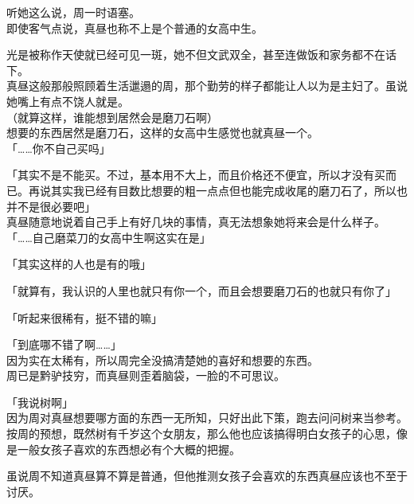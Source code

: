 听她这么说，周一时语塞。\\

即使客气点说，真昼也称不上是个普通的女高中生。

光是被称作天使就已经可见一斑，她不但文武双全，甚至连做饭和家务都不在话下。\\

真昼这般那般照顾着生活邋遢的周，那个勤劳的样子都能让人以为是主妇了。虽说她嘴上有点不饶人就是。\\

（就算这样，谁能想到居然会是磨刀石啊）\\

想要的东西居然是磨刀石，这样的女高中生感觉也就真昼一个。\\

「……你不自己买吗」

「其实不是不能买。不过，基本用不大上，而且价格还不便宜，所以才没有买而已。再说其实我已经有目数比想要的粗一点点但也能完成收尾的磨刀石了，所以也并不是很必要吧」\\

真昼随意地说着自己手上有好几块的事情，真无法想象她将来会是什么样子。\\

「……自己磨菜刀的女高中生啊这实在是」

「其实这样的人也是有的哦」

「就算有，我认识的人里也就只有你一个，而且会想要磨刀石的也就只有你了」

「听起来很稀有，挺不错的嘛」

「到底哪不错了啊……」\\

因为实在太稀有，所以周完全没搞清楚她的喜好和想要的东西。\\

周已是黔驴技穷，而真昼则歪着脑袋，一脸的不可思议。\\

\vspace{2\baselineskip}

「我说树啊」\\

因为周对真昼想要哪方面的东西一无所知，只好出此下策，跑去问问树来当参考。\\

按周的预想，既然树有千岁这个女朋友，那么他也应该搞得明白女孩子的心思，像是一般女孩子喜欢的东西想必有个大概的把握。

虽说周不知道真昼算不算是普通，但他推测女孩子会喜欢的东西真昼应该也不至于讨厌。\\

